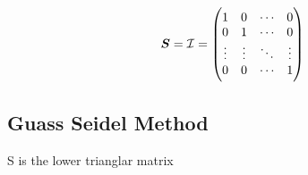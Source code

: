 \begin{equation}
	\boldsymbol{S} = \mathcal{I} = 
	\begin{pmatrix}
		1 & 0  & \cdots & 0\\
		0 & 1  & \cdots & 0\\
		\vdots & \vdots & \ddots & \vdots \\
		0 & 0 & \cdots & 1
	\end{pmatrix}
\end{equation}






\subsection{Guass Seidel Method}

S is the lower trianglar matrix





